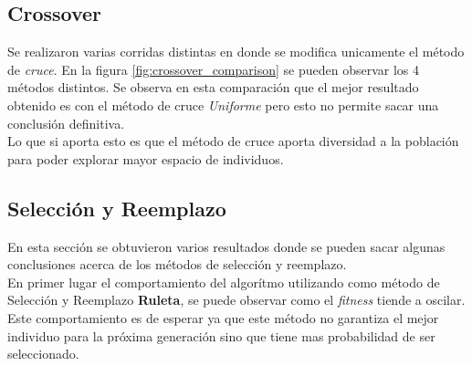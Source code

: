 \documentclass{sig-alternate}
\begin{document}
		\subsection{Crossover}

		Se realizaron varias corridas distintas en donde se modifica unicamente el método de \textit{cruce}. En la figura \ref{fig:crossover_comparison} se pueden observar los 4 métodos distintos. Se observa en esta comparación que el mejor resultado obtenido es con el método de cruce \textit{Uniforme} pero esto no permite sacar una conclusión definitiva. \\
		Lo que si aporta esto es que el método de cruce aporta diversidad a la población para poder explorar mayor espacio de individuos.

		\subsection{Selección y Reemplazo}

		En esta sección se obtuvieron varios resultados donde se pueden sacar algunas conclusiones acerca de los métodos de selección y reemplazo.\\
		En primer lugar el comportamiento del algorítmo utilizando como método de Selección y Reemplazo \textbf{Ruleta}, se puede observar como el \textit{fitness} tiende a oscilar. Este comportamiento es de esperar ya que este método no garantiza el mejor individuo para la próxima generación sino que tiene mas probabilidad de ser seleccionado.
		

\end{document}

